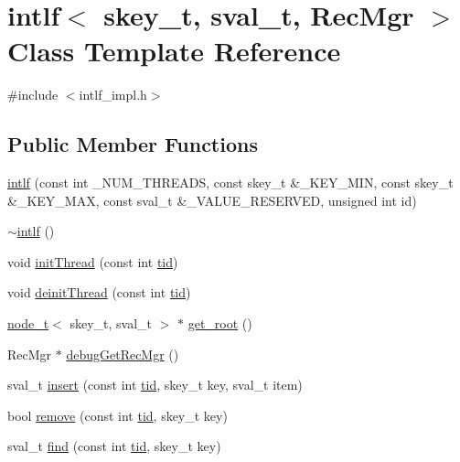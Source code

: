 \hypertarget{classintlf}{}\section{intlf$<$ skey\+\_\+t, sval\+\_\+t, Rec\+Mgr $>$ Class Template Reference}
\label{classintlf}


{\ttfamily \#include $<$intlf\+\_\+impl.\+h$>$}

\subsection*{Public Member Functions}
\begin{DoxyCompactItemize}
\item 
\hyperlink{classintlf_a6bd5eb6671be5a08d0efdc23eced2725}{intlf} (const int \+\_\+\+N\+U\+M\+\_\+\+T\+H\+R\+E\+A\+DS, const skey\+\_\+t \&\+\_\+\+K\+E\+Y\+\_\+\+M\+IN, const skey\+\_\+t \&\+\_\+\+K\+E\+Y\+\_\+\+M\+AX, const sval\+\_\+t \&\+\_\+\+V\+A\+L\+U\+E\+\_\+\+R\+E\+S\+E\+R\+V\+ED, unsigned int id)
\item 
\hyperlink{classintlf_a701e57f370a296fc3f73ed8c0ba0745c}{$\sim$intlf} ()
\item 
void \hyperlink{classintlf_a4b001c748e2bb49c74a9d65204776c73}{init\+Thread} (const int \hyperlink{microbench_2main_8cpp_a9ca9869868fe7e7a38a921cc7de4103f}{tid})
\item 
void \hyperlink{classintlf_ab394875c208489665f7d700accdb216d}{deinit\+Thread} (const int \hyperlink{microbench_2main_8cpp_a9ca9869868fe7e7a38a921cc7de4103f}{tid})
\item 
\hyperlink{structnode__t}{node\+\_\+t}$<$ skey\+\_\+t, sval\+\_\+t $>$ $\ast$ \hyperlink{classintlf_ac5a1a18fd5b9a34f3cbda1e2afd73bdd}{get\+\_\+root} ()
\item 
Rec\+Mgr $\ast$ \hyperlink{classintlf_aeeca12eca54beb687a0791436dec1933}{debug\+Get\+Rec\+Mgr} ()
\item 
sval\+\_\+t \hyperlink{classintlf_aee3e00131237612924107a00d5743f1c}{insert} (const int \hyperlink{microbench_2main_8cpp_a9ca9869868fe7e7a38a921cc7de4103f}{tid}, skey\+\_\+t key, sval\+\_\+t item)
\item 
bool \hyperlink{classintlf_a4f90087f9da607ffbcfad794131ddf17}{remove} (const int \hyperlink{microbench_2main_8cpp_a9ca9869868fe7e7a38a921cc7de4103f}{tid}, skey\+\_\+t key)
\item 
sval\+\_\+t \hyperlink{classintlf_aeb7ce634a90eca56c3b26412cb48d552}{find} (const int \hyperlink{microbench_2main_8cpp_a9ca9869868fe7e7a38a921cc7de4103f}{tid}, skey\+\_\+t key)
\end{DoxyCompactItemize}


